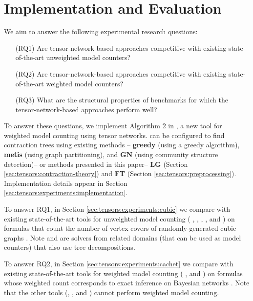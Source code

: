 \section{Implementation and Evaluation} \label{sec:tensors:experiments}
We aim to answer the following experimental research questions:
\begin{enumerate}
    \item[(RQ1)] Are tensor-network-based approaches competitive with existing state-of-the-art unweighted model counters?
    \item[(RQ2)] Are tensor-network-based approaches competitive with existing state-of-the-art weighted model counters?
    \item[(RQ3)] What are the structural properties of benchmarks for which the tensor-network-based approaches perform well?
\end{enumerate}

To answer these questions, we implement Algorithm 2 in , a new tool for weighted model counting using tensor networks.  can be configured to find contraction trees using existing methods \cite{KCMR18}-- \textbf{greedy} (using a greedy algorithm), \textbf{metis} (using graph partitioning), and \textbf{GN} (using community structure detection)-- or methods presented in this paper-- \textbf{LG} (Section \ref{sec:tensors:contraction-theory}) and \textbf{FT} (Section \ref{sec:tensors:preprocessing}). Implementation details appear in Section \ref{sec:tensors:experiments:implementation}.

To answer RQ1, in Section \ref{sec:tensors:experiments:cubic} we compare  with existing state-of-the-art tools for unweighted model counting ( \cite{CW16},  \cite{FHMW17},  \cite{Thurley2006},  \cite{SBK05},  \cite{OD15} and  \cite{LM17}) on formulas that count the number of vertex covers of randomly-generated cubic graphs \cite{KCMR18}. Note  and  are solvers from related domains (that can be used as model counters) that also use tree decompositions.

To answer RQ2, in Section \ref{sec:tensors:experiments:cachet} we compare  with existing state-of-the-art tools for weighted model counting ( \cite{SBK05},  \cite{OD15} and  \cite{LM17}) on formulas whose weighted count corresponds to exact inference on Bayesian networks \cite{SBK05}. Note that the other tools (, , and ) cannot perform weighted model counting.

